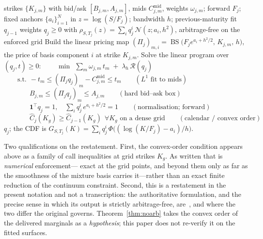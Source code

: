 \documentclass[11pt]{article}
\newcommand{\BS}{\operatorname{BS}}
\providecommand{\1}{\mathbf 1}
\begin{document}
\begin{algorithm}[htbp]
\caption{SANOS marginal-calibration LP at maturity $T_j$ (this paper's notation; after~\cite{buehler2026sanos}).}
\label{alg:sanos}
\begin{algorithmic}[1]
\Require strikes $\{K_{j,m}\}$ with bid/ask $[B_{j,m},A_{j,m}]$, mids $C^{\mathrm{mid}}_{j,m}$, weights $\omega_{j,m}$; forward $F_j$; fixed anchors $\{a_i\}_{i=1}^{N}$ in $z=\log(S/F_j)$; bandwidth $h$; previous-maturity fit $q_{j-1}$
\Ensure weights $q_j\ge0$ with $\rho_{S,T_j}(z)=\sum_i q_j^i\,\mathcal N(z;a_i,h^2)$, arbitrage-free on the enforced grid
\State Build the linear pricing map $(\Pi_j)_{m,i}=\BS\!\big(F_j e^{a_i+h^2/2},\,K_{j,m},\,h\big)$, the price of basis component $i$ at strike $K_{j,m}$.
\State Solve the linear program over $(q_j,t)\ge0$:
\Statex $\displaystyle\qquad \min\ \ \sum_m \omega_{j,m}\,t_m \;+\; \lambda_h\,\mathcal R(q_j)$
\Statex $\qquad \text{s.t.}\ \ -t_m \le (\Pi_j q_j)_m - C^{\mathrm{mid}}_{j,m} \le t_m \qquad (L^1\text{ fit to mids})$
\Statex $\qquad \phantom{\text{s.t.}}\ \ B_{j,m} \le (\Pi_j q_j)_m \le A_{j,m} \qquad (\text{hard bid--ask box})$
\Statex $\qquad \phantom{\text{s.t.}}\ \ \mathbf 1^\top q_j = 1,\quad \textstyle\sum_i q_j^i\,e^{a_i+h^2/2}=1 \qquad (\text{normalisation; forward})$
\Statex $\qquad \phantom{\text{s.t.}}\ \ \widehat C_j(K_g)\ge \widehat C_{j-1}(K_g)\ \ \forall K_g \text{ on a dense grid} \qquad (\text{calendar / convex order})$
\State \Return $q_j$; the CDF is $G_{S,T_j}(K)=\sum_i q_j^i\,\Phi\!\big((\log(K/F_j)-a_i)/h\big)$.
\end{algorithmic}
\end{algorithm}

\noindent Two qualifications on the restatement. First, the convex-order condition appears above as a
family of call inequalities at grid strikes $K_g$. As written that is \emph{numerical} enforcement---
exact at the grid points, and beyond them only as far as the smoothness of the mixture basis carries
it---rather than an exact finite reduction of the continuum constraint. Second, this is a restatement
in the present notation and not a transcription: the authoritative formulation, and the precise sense
in which its output is strictly arbitrage-free, are~\cite{buehler2026sanos}, and where the two differ
the original governs. Theorem~\ref{thm:noarb} takes the convex order of the delivered marginals as a
\emph{hypothesis}; this paper does not re-verify it on the fitted surfaces.

\end{document}
